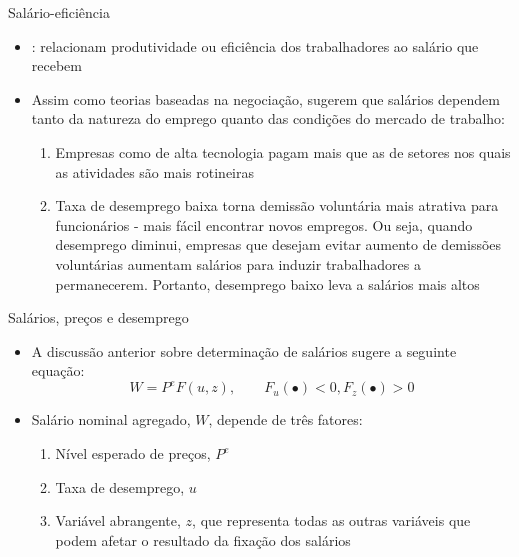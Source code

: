 \documentclass[10pt]{beamer}
\begin{document}
\begin{frame}
    {Salário-eficiência}
    \begin{itemize}
        \item {}: relacionam produtividade ou eficiência dos trabalhadores ao salário que recebem\bigskip
        \item Assim como teorias baseadas na negociação, sugerem que salários dependem tanto da natureza do emprego quanto das condições do mercado de trabalho:\medskip
        \begin{enumerate}
            \item Empresas como de alta tecnologia pagam mais que as de setores nos quais as atividades são mais rotineiras\medskip
            \item Taxa de desemprego baixa torna demissão voluntária mais atrativa para funcionários - mais fácil encontrar novos empregos. Ou seja, quando desemprego diminui, empresas que desejam evitar aumento de demissões voluntárias aumentam salários para induzir trabalhadores a permanecerem. Portanto, desemprego baixo leva a salários mais altos
        \end{enumerate}
    \end{itemize}
\end{frame}

\begin{frame}
    {Salários, preços e desemprego}
    \begin{itemize}
        \item A discussão anterior sobre determinação de salários sugere a seguinte equação:
        \begin{equation}
            W = P^eF(u,z), \qquad F_u(\bullet) < 0, F_z(\bullet) > 0
        \end{equation}
        \item Salário nominal agregado, $W$, depende de três fatores:
        \begin{enumerate}
            \item Nível esperado de preços, $P^e$\medskip
            \item Taxa de desemprego, $u$\medskip
            \item Variável abrangente, $z$, que representa todas as outras variáveis que podem afetar o resultado da fixação dos salários
        \end{enumerate}
    \end{itemize}
\end{frame}
\end{document}
